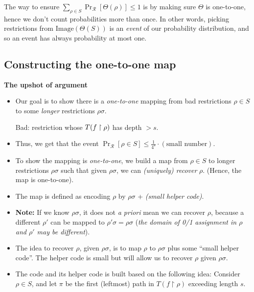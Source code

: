 The way to ensure
$\sum_{\rho \in S} \Pr_{\mathcal{R}}[\Theta(\rho)] \leq 1
$
is by making sure \( \Theta \) is one-to-one, 
hence we don't count probabilities more than once.
In other words, picking restrictions from \(\text{Image}(\Theta(S))\) is an \emph{event} of our probability distribution, and so an event has always probability at most one.

\subsection{Constructing the one-to-one map}


\begin{tcolorbox}[colframe=white, colback=blue!4, boxrule=0mm, sharp corners]
\textbf{The upshot of argument}
\begin{itemize}
    \item Our goal is to show there is a \emph{one-to-one} mapping from bad restrictions \( \rho \in S \) to some \emph{longer} restrictions \( \rho\sigma \). 

    Bad: restriction whose \( T(f\upharpoonright\rho) \) has depth \( > s \). 
    \item Thus, we get that the event \( \Pr_{\mathcal{R}}[ \rho \in S ] \leq \frac{1}{4^s} \cdot (\text{small number}) \).
    
    \item To show the mapping is \emph{one-to-one}, we build a map from \( \rho \in S \) to longer restrictions \( \rho\sigma \) such that given \( \rho\sigma \), we can \emph{(uniquely) recover} \( \rho \). (Hence, the map is one-to-one).
    
    \item The map is defined as encoding \( \rho \) by \( \rho\sigma \) + \emph{(small helper code)}.

    \item \textbf{Note:} If we know \( \rho\sigma \), it does not \emph{a priori} mean we can recover \( \rho \), because a different \( \rho' \) can be mapped to \( \rho'\sigma = \rho\sigma \) (\emph{the domain of 0/1 assignment in \( \rho \) and \( \rho' \) may be different}).
    
    \item The idea to recover \( \rho \), given \( \rho\sigma \), is to map \( \rho \) to \( \rho\sigma \) plus some ``small helper code''. The helper code is small but will allow us to recover \( \rho \) given \( \rho\sigma \).

    \item The code and its helper code is built based on the following idea: Consider \( \rho \in S \), and let \( \pi \) be the first (leftmost) path in \( T(f \restriction \rho) \) exceeding length \( s \). 
    

\end{itemize}
\end{tcolorbox}
